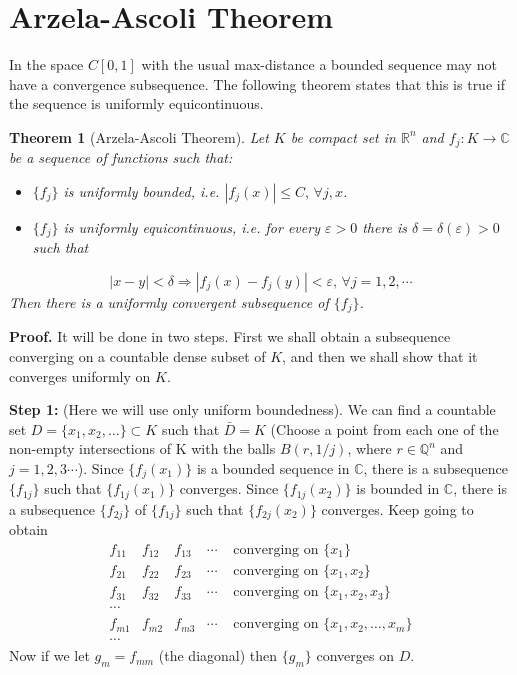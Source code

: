 \documentclass[12pt]{report}
\newtheorem{theorem}{Theorem}[section]
\begin{document}
\section{Arzela-Ascoli Theorem}
In the space $C[0, 1]$ with the usual max-distance
a bounded sequence may not have a convergence subsequence.
The following theorem states that this is true if the sequence
is uniformly equicontinuous.


\begin{theorem}[Arzela-Ascoli Theorem] \label{th:Arz-Asc}
Let $K$ be compact set in $\mathbb{R}^n$ and $f_j : K \to
\mathbb{C} $ be a sequence of functions such that:
\begin{itemize}
\item[1.]  $\{f_j\}$ is uniformly bounded,
 i.e. $|f_j(x)| \le C,\,  \forall j,x$.
\item[2.]  $\{f_j\}$ is uniformly equicontinuous, i.e.
for every $\varepsilon > 0$ there is $\delta = \delta
(\varepsilon) > 0$  such that
\end{itemize}
\[
 |x-y| < \delta \Longrightarrow |f_j(x) - f_j(y)| <
\varepsilon,\, \forall j=1, 2,\cdots
\]
Then there is a uniformly convergent subsequence of $\{f_j\}$.
\end{theorem}
{\bf Proof. } It will be done in two steps. First we shall
   obtain a subsequence converging on a countable
dense subset of $K$, and then
we shall show that it converges uniformly on $K$.

\vspace{2mm}
\noindent
{\bf Step 1:} (Here we will use only uniform boundedness).
We  can find  a countable set $D = \{x_1, x_2, \dots\}\subset K$ 
such  that $\bar D = K$ (Choose a point from each one of the
non-empty intersections of K with the balls $B(r,1/j)$, where 
$r\in\mathbb{Q}^n$  and $j=1, 2, 3\cdots$). 
 Since $\{f_j(x_1)\}$ is a bounded sequence in $\mathbb{C}$, there
is a subsequence $\{f_{1j}\}$ such that $\{f_{1j}(x_1)\}$
converges.  Since
$\{f_{1j}(x_2)\}$ is bounded in $\mathbb{C}$, there is a
subsequence $\{f_{2j}\}$ of  $\{f_{1j}\}$  such
that $\{f_{2j}(x_2)\}$ converges. Keep going to obtain
\[\begin{array}{rrrcl}
f_{11} &f_{12} &f_{13} &\cdots &\mbox{ converging on } \{x_1\}\\
f_{21} &f_{22} &f_{23} &\cdots &\mbox{ converging on } \{x_1,
x_2\}\\ 
f_{31} &f_{32} &f_{33} &\cdots &\mbox{ converging on  } 
\{x_1, x_2, x_3\}\\
\cdots &&&&\\
f_{m1} &f_{m2} &f_{m3} &\cdots &\mbox{ converging on } \{x_1,
x_2,
\dots, x_m\}\\
\cdots &&&&
\end{array}
\]
Now if we let $g_m = f_{mm}$ (the diagonal) then
$\{g_m\}$ converges on $D$.
\end{document}
